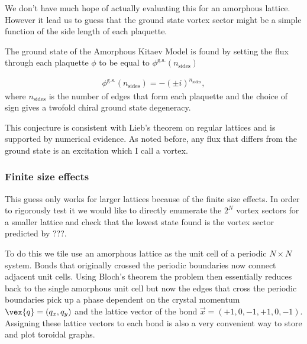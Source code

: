 We don't have much hope of actually evaluating this for an amorphous lattice. However it lead us to guess that the ground state vortex sector might be a simple function of the side length of each plaquette.

The ground state of the Amorphous Kitaev Model is found by setting the flux through each plaquette \(\phi\) to be equal to \(\phi^{\mathrm{g.s.}}(n_{\mathrm{sides}})\)

\[\begin{aligned}
    \phi^{\mathrm{g.s.}}(n_{\mathrm{sides}}) = -(\pm i)^{n_{\mathrm{sides}}},
\end{aligned}\] where \(n_{\mathrm{sides}}\) is the number of edges that form each plaquette and the choice of sign gives a twofold chiral ground state degeneracy.

This conjecture is consistent with Lieb's theorem on regular lattices \autocite{lieb_flux_1994} and is supported by numerical evidence. As noted before, any flux that differs from the ground state is an excitation which I call a vortex.

\hypertarget{finite-size-effects}{%
\subsubsection{Finite size effects}\label{finite-size-effects}}

This guess only works for larger lattices because of the finite size effects. In order to rigorously test it we would like to directly enumerate the \(2^N\) vortex sectors for a smaller lattice and check that the lowest state found is the vortex sector predicted by ???.

To do this we tile use an amorphous lattice as the unit cell of a periodic \(N\times N\) system. Bonds that originally crossed the periodic boundaries now connect adjacent unit cells. Using Bloch's theorem the problem then essentially reduces back to the single amorphous unit cell but now the edges that cross the periodic boundaries pick up a phase dependent on the crystal momentum \(\vex{q} = (q_x, q_y)\) and the lattice vector of the bond \(\vec{x} = (+1, 0, -1, +1, 0, -1)\). Assigning these lattice vectors to each bond is also a very convenient way to store and plot toroidal graphs.

